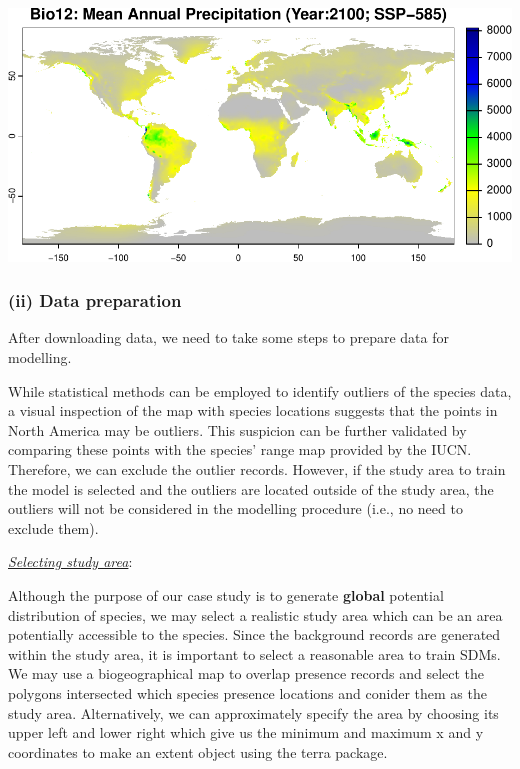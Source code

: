 \documentclass[
]{article}
\begin{document}
\includegraphics{sdm_R_files/figure-latex/unnamed-chunk-2-3.pdf}

\subsubsection{(ii) Data preparation}\label{ii-data-preparation}

After downloading data, we need to take some steps to prepare data for
modelling.

While statistical methods can be employed to identify outliers of the
species data, a visual inspection of the map with species locations
suggests that the points in North America may be outliers. This
suspicion can be further validated by comparing these points with the
species' range map provided by the IUCN. Therefore, we can exclude the
outlier records. However, if the study area to train the model is
selected and the outliers are located outside of the study area, the
outliers will not be considered in the modelling procedure (i.e., no
need to exclude them).

\uline{\textit{Selecting study area}}:

Although the purpose of our case study is to generate \textbf{global}
potential distribution of species, we may select a realistic study area
which can be an area potentially accessible to the species. Since the
background records are generated within the study area, it is important
to select a reasonable area to train SDMs. We may use a biogeographical
map to overlap presence records and select the polygons intersected
which species presence locations and conider them as the study area.
Alternatively, we can approximately specify the area by choosing its
upper left and lower right which give us the minimum and maximum x and y
coordinates to make an extent object using the terra package.
\end{document}
